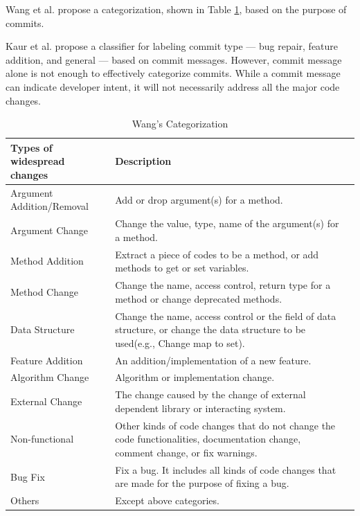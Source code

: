 Wang et al. propose a categorization, shown in Table \ref{tab:wang}, based on the purpose of commits.

Kaur et al. \cite{kaur_2018} propose a classifier for labeling commit type --- bug repair, feature addition, and general --- based on commit messages.
However, commit message alone is not enough to effectively categorize commits. While a commit message can indicate developer intent, it will not necessarily address all the major code changes. 

\begin{table}[htbp]
  \centering
  \caption{Wang's Categorization}
    \begin{tabular}{|p{8em}|p{17.5em}r|}
    \hline
    Types of widespread changes & \multicolumn{1}{p{17.5em}|}{Description} \\
    \hline
    Argument Addition/Removal & \multicolumn{1}{p{17.5em}|}{Add or drop argument(s) for a method.} \\
    \hline
    Argument Change & \multicolumn{1}{p{17.5em}|}{Change the value, type, name of the argument(s) for a method.} \\
    \hline
    Method Addition  & \multicolumn{1}{p{17.5em}|}{Extract a piece of codes to be a method, or add methods to get or set variables.} \\
    \hline
    Method Change  & \multicolumn{1}{p{17.5em}|}{Change the name, access control, return type for a method or change deprecated methods.} \\
    \hline
    Data Structure  & \multicolumn{1}{p{17.5em}|}{Change the name, access control or the field of data structure, or change the data structure to be used(e.g., Change map to set).} \\
    \hline
    Feature Addition  & \multicolumn{1}{p{17.5em}|}{An addition/implementation of a new feature.} \\
    \hline
    Algorithm Change  & \multicolumn{1}{p{17.5em}|}{Algorithm or implementation change.} \\
    \hline
    External Change  & \multicolumn{1}{p{17.5em}|}{The change caused by the change of external dependent library or interacting system.} \\
    \hline
    Non-functional  & \multicolumn{1}{p{17.5em}|}{Other kinds of code changes that do not change the code functionalities, documentation change, comment change, or fix warnings.} \\
    \hline
    Bug Fix  & \multicolumn{1}{p{17.5em}|}{Fix a bug. It includes all kinds of code changes that are made for the purpose of fixing a bug.} \\
    \hline
    Others  & \multicolumn{1}{p{17.5em}|}{Except above categories.} \\
    \hline
    \end{tabular}%
  \label{tab:wang}%
\end{table}%

